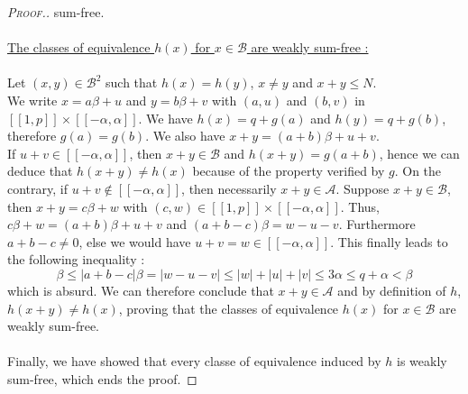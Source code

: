 \begin{proof}[\textsc{Proof.}]
sum-free.\\
\\
\underline{The classes of equivalence \(h(x)\) for \(x \in \mathcal{B}\) are weakly sum-free :}
\\
\\
Let \((x,y) \in \mathcal{B}^2\) such that \(h(x) = h(y)\), \(x \neq y\) and \(x + y \leqslant N\).\\
We write \(x = a\beta + u\) and \(y = b\beta + v\) with \((a,u)\) and \((b,v)\) in \([\![1,p]\!] \times
[\![-\alpha,\alpha]\!]\).
We have \(h(x) = q + g(a)\) and \(h(y) = q + g(b)\), therefore \(g(a) = g(b)\). We also have \(x+y = (a+b)\beta + u
+v\).\\
If \(u + v \in [\![-\alpha,\alpha]\!]\), then \(x+y \in \mathcal{B}\) and \(h(x+y) = g(a+b)\), hence we can deduce that
\(h(x+y) \neq h(x)\) because of the property verified by \(g\). On the contrary, if \(u+v \notin
[\![-\alpha,\alpha]\!]\), then necessarily \(x+y \in \mathcal{A}\). Suppose \(x+y \in \mathcal{B}\), then \(x+y =
c\beta+ w\) with \((c,w) \in [\![1,p]\!] \times [\![-\alpha,\alpha]\!]\). Thus, \(c\beta + w = (a+b)\beta + u + v\) and
\((a+b-c)\beta = w-u-v\). Furthermore \(a+b-c \neq 0\), else we would have \(u+v = w \in [\![-\alpha,\alpha]\!]\). This
finally leads to the following inequality :
\[\beta \leqslant |a+b-c|\beta = |w-u-v| \leqslant |w| + |u| + |v| \leqslant 3\alpha \leqslant q + \alpha < \beta
\]
which is absurd. We can therefore conclude that \(x+y \in \mathcal{A}\) and by definition of \(h\), \(h(x+y) \neq
h(x)\), proving that the classes of equivalence \(h(x)\) for \(x \in \mathcal{B}\) are weakly sum-free.\\
\\
Finally, we have showed that every classe of equivalence induced by \(h\) is weakly sum-free, which ends the proof.
\end{proof}
